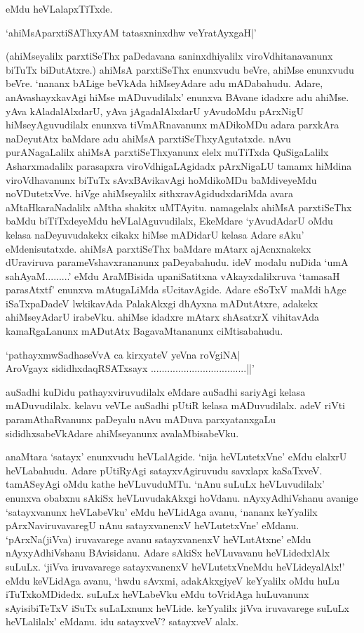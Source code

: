 eMdu heVLalapxTiTxde.

\begin{shloka}
`ahiMsAparxtiSAThxyAM tatasxninxdhw veYratAyxgaH|'
\end{shloka}

(ahiMseyalilx parxtiSeThx paDedavana saninxdhiyalilx viroVdhitanavanunx biTuTx biDutAtxre.) ahiMsA parxtiSeThx enunxvudu beVre, ahiMse enunxvudu beVre. `nananx bALige beVkAda hiMseyAdare adu mADabahudu. Adare, anAvashayxkavAgi hiMse mADuvudilalx' enunxva BAvane idadxre adu ahiMse. yAva kAladalAlxdarU, yAva jAgadalAlxdarU yAvudoMdu pArxNigU hiMseyAguvudilalx enunxva tiVmARnavanunx mADikoMDu adara parxkAra naDeyutAtx baMdare adu ahiMsA parxtiSeThxyAgutatxde. nAvu purANagaLalilx ahiMsA parxtiSeThxyanunx elelx muTiTxda QuSigaLalilx Asharxmadalilx parasapxra viroVdhigaLAgidadx pArxNigaLU tamamx hiMdina viroVdhavanunx biTuTx sAvxBAvikavAgi hoMdikoMDu baMdiveyeMdu noVDutetxVve. hiVge ahiMseyalilx sithxravAgidudxdariMda avara aMtaHkaraNadalilx aMtha shakitx uMTAyitu. namagelalx ahiMsA parxtiSeThx baMdu biTiTxdeyeMdu heVLalAguvudilalx, EkeMdare `yAvudAdarU oMdu kelasa naDeyuvudakekx cikakx hiMse mADidarU kelasa Adare sAku' eMdenisutatxde. ahiMsA parxtiSeThx baMdare mAtarx ajAcnxnakekx dUraviruva parameVshavxrananunx paDeyabahudu. ideV modalu nuDida `umA sahAyaM.........' eMdu AraMBisida upaniSatitxna vAkayxdalilxruva `tamasaH parasAtxtf' enunxva mAtugaLiMda sUcitavAgide. Adare eSoTxV maMdi hAge iSaTxpaDadeV lwkikavAda PalakAkxgi dhAyxna mADutAtxre, adakekx ahiMseyAdarU irabeVku. ahiMse idadxre mAtarx shAsatxrX vihitavAda kamaRgaLanunx mADutAtx BagavaMtananunx ciMtisabahudu.

\begin{shloka}
`pathayxmwSadhaseVvA ca kirxyateV yeVna roVgiNA|\\
AroVgayx sididhxdaqRSATxsayx ...................................||'
\end{shloka}

auSadhi kuDidu pathayxviruvudilalx eMdare auSadhi sariyAgi kelasa mADuvudilalx. kelavu veVLe auSadhi pUtiR kelasa mADuvudilalx. adeV riVti paramAthaRvanunx paDeyalu nAvu mADuva parxyatanxgaLu sididhxsabeVkAdare ahiMseyanunx avalaMbisabeVku.

anaMtara `satayx' enunxvudu heVLalAgide. `nija heVLutetxVne' eMdu elalxrU heVLabahudu. Adare pUtiRyAgi satayxvAgiruvudu savxlapx kaSaTxveV. tamASeyAgi oMdu kathe heVLuvuduMTu. `nAnu suLuLx heVLuvudilalx' enunxva obabxnu sAkiSx heVLuvudakAkxgi hoVdanu. nAyxyAdhiVshanu avanige `satayxvanunx heVLabeVku' eMdu heVLidAga avanu, `nananx keYyalilx pArxNaviruvavaregU nAnu satayxvanenxV heVLutetxVne' eMdanu. `pArxNa(jiVva) iruvavarege avanu satayxvanenxV heVLutAtxne' eMdu nAyxyAdhiVshanu BAvisidanu. Adare sAkiSx heVLuvavanu heVLidedxlAlx suLuLx. `jiVva iruvavarege satayxvanenxV heVLutetxVneMdu heVLideyalAlx!' eMdu keVLidAga avanu, `hwdu sAvxmi, adakAkxgiyeV keYyalilx oMdu huLu iTuTxkoMDidedx. suLuLx heVLabeVku eMdu toVridAga huLuvanunx sAyisibiTeTxV iSuTx suLaLxnunx heVLide. keYyalilx jiVva iruvavarege suLuLx heVLalilalx' eMdanu. idu satayxveV? satayxveV alalx.

